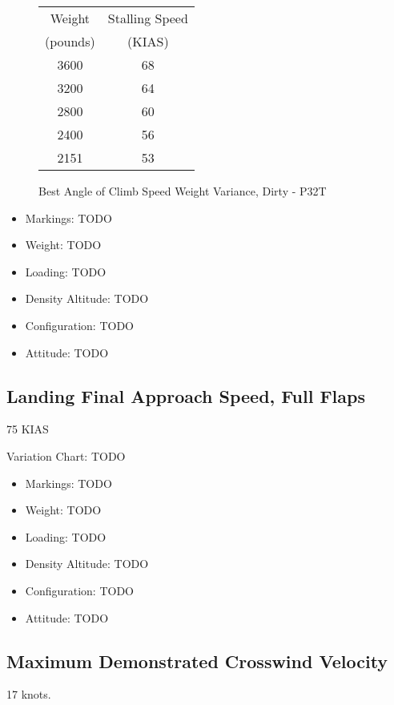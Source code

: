 \begin{figure}
\begin{center}
\begin{tabular}{ |c|c| }
    \hline
    Weight & Stalling Speed \\
    (pounds) & (KIAS) \\
    \hline
     3600 &  68 \\
     3200 &  64 \\
    \hline
     2800 &  60 \\
     2400 &  56 \\
    \hline
     2151 &  53 \\
    \hline
\end{tabular}
\end{center}
\caption{Best Angle of Climb Speed Weight Variance, Dirty - P32T}
\label{fig:VXDirtyP32T}
\end{figure}

\begin{itemize}
\item Markings: TODO
\item Weight: TODO
\item Loading: TODO
\item Density Altitude: TODO
\item Configuration: TODO
\item Attitude: TODO
\end{itemize}

\subsection{Landing Final Approach Speed, Full Flaps}

75 KIAS

Variation Chart: TODO
\begin{itemize}
\item Markings: TODO
\item Weight: TODO
\item Loading: TODO
\item Density Altitude: TODO
\item Configuration: TODO
\item Attitude: TODO
\end{itemize}

\subsection{Maximum Demonstrated Crosswind Velocity}

17 knots.

